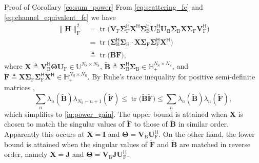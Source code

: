 \documentclass[journal]{IEEEtran}
\DeclareMathOperator{\tr}{tr}
\begin{document}
\begin{appendix}
	\begin{subsection}{Proof of Corollary \ref{co:sum_power}}\label{ap:sum_power}
		From \eqref{eq:scattering_fc} and \eqref{eq:channel_equivalent_fc} we have
		\begin{equation}
			\begin{split}
				\lVert \mathbf{H} \rVert _\mathrm{F}^2
				& = \tr \bigl(\mathbf{V}_\mathrm{F} \mathbf{\Sigma}_\mathrm{F}^\mathsf{H} \mathbf{X}^\mathsf{H} \mathbf{\Sigma}_\mathrm{B}^\mathsf{H} \mathbf{U}_\mathrm{B}^\mathsf{H} \mathbf{U}_\mathrm{B} \mathbf{\Sigma}_\mathrm{B} \mathbf{X} \mathbf{\Sigma}_\mathrm{F} \mathbf{V}_\mathrm{F}^\mathsf{H}\bigr) \\
				& = \tr \bigl(\mathbf{\Sigma}_\mathrm{B}^\mathsf{H} \mathbf{\Sigma}_\mathrm{B} \cdot \mathbf{X} \mathbf{\Sigma}_\mathrm{F} \mathbf{\Sigma}_\mathrm{F}^\mathsf{H} \mathbf{X}^\mathsf{H}\bigr) \\
				& \triangleq \tr \bigl(\tilde{\mathbf{B}} \tilde{\mathbf{F}}\bigr),
			\end{split}
			\label{eq:channel_power_gain}
		\end{equation}
		where $\mathbf{X} \triangleq \mathbf{V}_\mathrm{B}^\mathsf{H} \mathbf{\Theta} \mathbf{U}_\mathrm{F} \in \mathbb{U}^{N_\mathrm{S} \times N_\mathrm{S}}$, $\tilde{\mathbf{B}} \triangleq \mathbf{\Sigma}_\mathrm{B}^\mathsf{H} \mathbf{\Sigma}_\mathrm{B} \in \mathbb{H}_+^{N_\mathrm{S} \times N_\mathrm{S}}$, and $\tilde{\mathbf{F}} \triangleq \mathbf{X} \mathbf{\Sigma}_\mathrm{F} \mathbf{\Sigma}_\mathrm{F}^\mathsf{H} \mathbf{X}^\mathsf{H} \in \mathbb{H}_+^{N_\mathrm{S} \times N_\mathrm{S}}$.
		By Ruhe's trace inequality for positive semi-definite matrices \cite[H.1.g and H.1.h]{Marshall2010},
		\begin{equation*}
			\sum_n \lambda_n(\tilde{\mathbf{B}}) \lambda_{N_\mathrm{S}-n+1}(\tilde{\mathbf{F}}) \le \tr \bigl(\tilde{\mathbf{B}} \tilde{\mathbf{F}}\bigr) \le \sum_n \lambda_n(\tilde{\mathbf{B}}) \lambda_n(\tilde{\mathbf{F}}),
		\end{equation*}
		which simplifies to \eqref{iq:power_gain}.
		The upper bound is attained when $\mathbf{X}$ is chosen to match the singular values of $\tilde{\mathbf{F}}$ to those of $\tilde{\mathbf{B}}$ in similar order.
		Apparently this occurs at $\mathbf{X} = \mathbf{I}$ and $\mathbf{\Theta} = \mathbf{V}_\mathrm{B} \mathbf{U}_\mathrm{F}^\mathsf{H}$.
		On the other hand, the lower bound is attained when the singular values of $\tilde{\mathbf{F}}$ and $\tilde{\mathbf{B}}$ are matched in reverse order, namely $\mathbf{X} = \mathbf{J}$ and $\mathbf{\Theta} = \mathbf{V}_\mathrm{B} \mathbf{J} \mathbf{U}_\mathrm{F}^\mathsf{H}$.
	\end{subsection}


\end{appendix}
\end{document}
